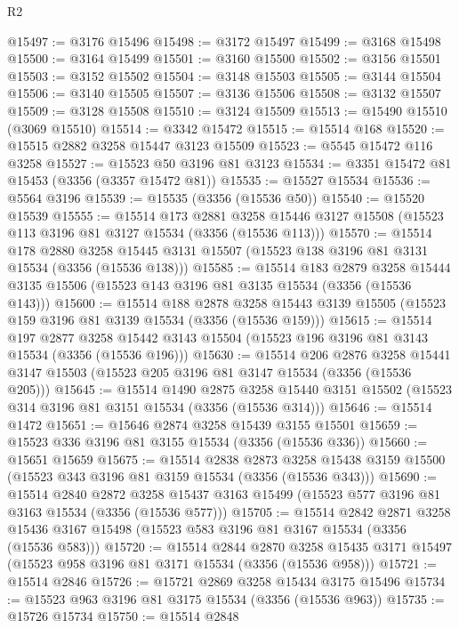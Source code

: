 \begin{lexlean}{R2}
\begin{coremodule}
@15497 := @3176 @15496
@15498 := @3172 @15497
@15499 := @3168 @15498
@15500 := @3164 @15499
@15501 := @3160 @15500
@15502 := @3156 @15501
@15503 := @3152 @15502
@15504 := @3148 @15503
@15505 := @3144 @15504
@15506 := @3140 @15505
@15507 := @3136 @15506
@15508 := @3132 @15507
@15509 := @3128 @15508
@15510 := @3124 @15509
@15513 := @15490 @15510 (@3069 @15510)
@15514 := @3342 @15472
@15515 := @15514 @168
@15520 := @15515 @2882 @3258 @15447 @3123 @15509
@15523 := @5545 @15472 @116 @3258
@15527 := @15523 @50 @3196 @81 @3123
@15534 := @3351 @15472 @81 @15453 (@3356 (@3357 @15472 @81))
@15535 := @15527 @15534
@15536 := @5564 @3196
@15539 := @15535 (@3356 (@15536 @50))
@15540 := @15520 @15539
@15555 := @15514
    @173
    @2881
    @3258
    @15446
    @3127
    @15508
    (@15523 @113 @3196 @81 @3127 @15534 (@3356 (@15536 @113)))
@15570 := @15514
    @178
    @2880
    @3258
    @15445
    @3131
    @15507
    (@15523 @138 @3196 @81 @3131 @15534 (@3356 (@15536 @138)))
@15585 := @15514
    @183
    @2879
    @3258
    @15444
    @3135
    @15506
    (@15523 @143 @3196 @81 @3135 @15534 (@3356 (@15536 @143)))
@15600 := @15514
    @188
    @2878
    @3258
    @15443
    @3139
    @15505
    (@15523 @159 @3196 @81 @3139 @15534 (@3356 (@15536 @159)))
@15615 := @15514
    @197
    @2877
    @3258
    @15442
    @3143
    @15504
    (@15523 @196 @3196 @81 @3143 @15534 (@3356 (@15536 @196)))
@15630 := @15514
    @206
    @2876
    @3258
    @15441
    @3147
    @15503
    (@15523 @205 @3196 @81 @3147 @15534 (@3356 (@15536 @205)))
@15645 := @15514
    @1490
    @2875
    @3258
    @15440
    @3151
    @15502
    (@15523 @314 @3196 @81 @3151 @15534 (@3356 (@15536 @314)))
@15646 := @15514 @1472
@15651 := @15646 @2874 @3258 @15439 @3155 @15501
@15659 := @15523 @336 @3196 @81 @3155 @15534 (@3356 (@15536 @336))
@15660 := @15651 @15659
@15675 := @15514
    @2838
    @2873
    @3258
    @15438
    @3159
    @15500
    (@15523 @343 @3196 @81 @3159 @15534 (@3356 (@15536 @343)))
@15690 := @15514
    @2840
    @2872
    @3258
    @15437
    @3163
    @15499
    (@15523 @577 @3196 @81 @3163 @15534 (@3356 (@15536 @577)))
@15705 := @15514
    @2842
    @2871
    @3258
    @15436
    @3167
    @15498
    (@15523 @583 @3196 @81 @3167 @15534 (@3356 (@15536 @583)))
@15720 := @15514
    @2844
    @2870
    @3258
    @15435
    @3171
    @15497
    (@15523 @958 @3196 @81 @3171 @15534 (@3356 (@15536 @958)))
@15721 := @15514 @2846
@15726 := @15721 @2869 @3258 @15434 @3175 @15496
@15734 := @15523 @963 @3196 @81 @3175 @15534 (@3356 (@15536 @963))
@15735 := @15726 @15734
@15750 := @15514
    @2848

\end{coremodule}
\end{lexlean}

